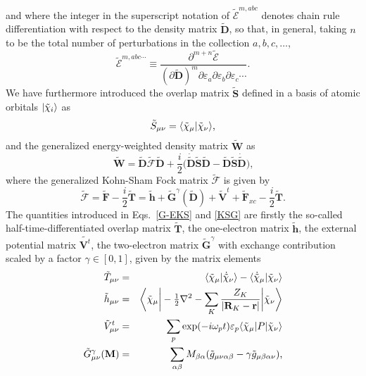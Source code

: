 \documentclass[%
 reprint,
 amsmath,amssymb,
 aps,
]{revtex4-1}
\begin{document}
and where the integer in the superscript notation of $\tilde{\mathcal{E}}^{m,
abc}$ denotes chain rule differentiation with respect to the density matrix
$\tilde{\mathbf{D}}$, so that, in general, taking $n$ to be the total number of
perturbations in the collection $a, b, c, \ldots$,
\begin{equation}\label{E-chain-rule}
\tilde{\mathcal{E}}^{m, abc\cdots} \equiv \frac{\partial^{m + n}\tilde{\mathcal{E}}}{ \left( \partial \tilde{\mathbf{D}} \right)^{m} \partial \varepsilon_{a} \partial \varepsilon_{b} \partial \varepsilon_{c} \cdots}\text{.}
\end{equation}
We have furthermore introduced the overlap matrix $\tilde{\mathbf{S}}$ defined
in a basis of atomic orbitals $|\tilde{\chi}_{i}\rangle$ as
\begin{equation}\label{S}
\tilde{S}_{\mu \nu} = \langle\tilde{\chi}_{\mu} |\tilde{\chi}_{\nu}\rangle \text{,}
\end{equation}
and the generalized energy-weighted density matrix $\tilde{\mathbf{W}}$ as
\begin{equation}\label{W}
\tilde{\mathbf{W}} =
\tilde{\mathbf{D}} \tilde{\bm{\mathcal{F}}} \tilde{\mathbf{D}} +
{\textstyle \frac{i}{2}} \bigl(
\dot{\tilde{\mathbf{D}}} \tilde{\mathbf{S}} \tilde{\mathbf{D}}
-\tilde{\mathbf{D}} \tilde{\mathbf{S}} \dot{\tilde{\mathbf{D}}}
\bigr)\text{,}
\end{equation}
where the generalized Kohn-Sham Fock matrix $\tilde{\bm{\mathcal{F}}}$ is given by
\begin{equation}\label{KSG}
\tilde{\bm{\mathcal{F}}} = \tilde{\mathbf{F}} - {\textstyle \frac{i}{2}} \tilde{\mathbf{T}} =
\tilde{\mathbf{h}} +
\tilde{\mathbf{G}}^{\gamma} (\tilde{\mathbf{D}})
+ \tilde{\mathbf{V}}^t + \tilde{\mathbf{F}}_{xc} - {\textstyle \frac{i}{2}} \tilde{\mathbf{T}}\text{.}
\end{equation}
The quantities introduced in Eqs.~\eqref{G-EKS} and \eqref{KSG} are firstly the
so-called half-time-differentiated overlap matrix $\tilde{\mathbf{T}}$, the
one-electron matrix $\tilde{\mathbf{h}}$, the external potential matrix
$\tilde{\mathbf{V}^{t}}$, the two-electron matrix $\tilde{\mathbf{G}}^{\gamma}$
with exchange contribution scaled by a factor $\gamma \in [0,1]$, given by the
matrix elements
\begin{eqnarray}
\label{t-matrix}
\tilde{T}_{\mu \nu} &=& \langle\tilde{\chi}_{\mu} |\dot{\tilde{\chi}}_{\nu}\rangle - \langle\dot{\tilde{\chi}}_{\mu} |\tilde{\chi}_{\nu}\rangle \\
\label{h-matrix}
\tilde{h}_{\mu \nu} &=& \biggr{\langle} \tilde{\chi}_{\mu} \biggr{|}
- {\textstyle \frac{1}{2}} \nabla^2 - \sum_K \frac{Z_K}{|\mathbf{R}_K-\mathbf{r}|}
\biggr{|} \tilde{\chi}_{\nu} \biggr{\rangle} \\ \label{Vt_munu}
\tilde{V}^t_{\mu \nu} &=&
\sum_{p} \exp(-i \omega_p t) \varepsilon_{p}
\langle\tilde{\chi}_{\mu}|
P
|\tilde{\chi}_{\nu}\rangle \\
\label{G-matrix}
\tilde{G}^{\gamma}_{\mu \nu}(\mathbf{M}) &=& \sum_{\alpha \beta} M_{\beta \alpha} (\tilde{g}_{\mu \nu \alpha \beta} - \gamma \tilde{g}_{\mu \beta \alpha \nu}) \text{,}
\end{eqnarray}
\end{document}
